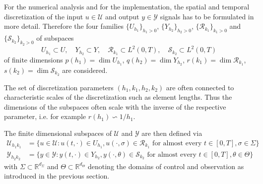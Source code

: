 \documentclass[a4paper,10pt,BCOR=15mm]{scrbook}
\begin{document}
For the numerical analysis and for the implementation, the spatial and temporal discretization of the input $u \in \mathcal U$ and output $y \in \mathcal Y$ signals has to be formulated in more detail. Therefore the four families $\{U_{h_1}\}_{h_1>0}$, $\{Y_{h_2}\}_{h_2>0}$, $\{\mathcal R_{k_1}\}_{k_1>0}$ and $\{\mathcal S_{k_2}\}_{k_2>0}$ of subspaces
\begin{equation*}
 U_{h_1} \subset U, \quad Y_{h_2} \subset Y, \quad \mathcal R_{k_1} \subset L^2(0,T), \quad \mathcal S_{k_2} \subset L^2(0,T)
\end{equation*}
of finite dimensions $p(h_1) = \dim U_{h_1}$, $q(h_2) = \dim Y_{h_2}$, $r(k_1) = \dim \mathcal R_{k_1}$, $s(k_2) = \dim \mathcal S_{k_2}$ 
are considered. 

The set of discretization parameters $(h_1,k_1,h_2,k_2)$ are often connected to characteristic scales of the discretization such as element lengths. Thus the dimensions of the subspaces often scale with the inverse of the respective parameter, i.e. for example $r(h_1) \backsim 1/h_1$.

The finite dimensional subspaces of $\mathcal U$ and $\mathcal Y$ are then defined via
\begin{align*}
 \mathcal U _{h_1k_1} &= \{ u \in \mathcal U : u(t,\cdot) \in U _{h_1}, u(\cdot, \sigma) \in \mathcal R_{k_1} \text{  for almost every  } t \in [0,T], \sigma \in \Sigma \} \\
\mathcal Y _{h_2k_2} &= \{ y \in \mathcal Y : y(t,\cdot) \in Y _{h_2}, y(\cdot, \theta) \in \mathcal S_{k_2} \text{  for almost every  } t \in [0,T], \theta \in \Theta \}
\end{align*}
with $\Sigma \subset \mathbb R^{d_\Sigma}$ and $\Theta \subset \mathbb R^{d_\Theta}$ denoting the domains of control and observation as introduced in the previous section. 
\end{document}
